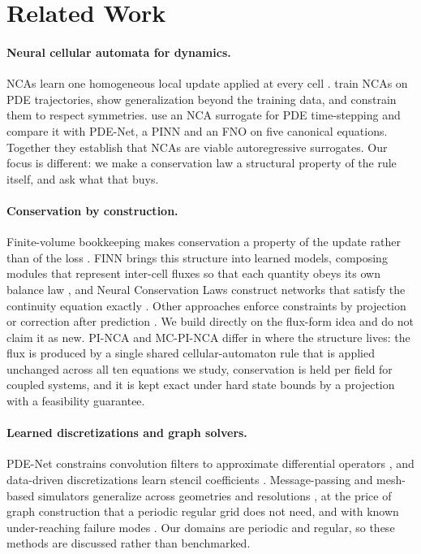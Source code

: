 \documentclass{article}
\begin{document}
\section{Related Work}
\label{sec:related}
\paragraph{Neural cellular automata for dynamics.}
NCAs learn one homogeneous local update applied at every cell
\citep{mordvintsev2020growing}. \citet{richardson2024patterns} train NCAs on PDE
trajectories, show generalization beyond the training data, and constrain them to respect
symmetries. \citet{saha2026timestepping} use an NCA surrogate for PDE time-stepping and
compare it with PDE-Net, a PINN and an FNO on five canonical equations. Together they
establish that NCAs are viable autoregressive surrogates. Our focus is different: we make
a conservation law a structural property of the rule itself, and ask what that buys.

\paragraph{Conservation by construction.}
Finite-volume bookkeeping makes conservation a property of the update rather than of the
loss \citep{leveque2002finite}. FINN brings this structure into learned models, composing
modules that represent inter-cell fluxes so that each quantity obeys its own balance law
\citep{praditia2021finn,karlbauer2022composing}, and Neural Conservation Laws construct
networks that satisfy the continuity equation exactly \citep{richterpowell2022conservation}.
Other approaches enforce constraints by projection or correction after prediction
\citep{hansen2023probconserv,liu2024clawno}. We build directly on the flux-form idea and
do not claim it as new. PI-NCA and MC-PI-NCA differ in where the structure lives: the flux
is produced by a single shared cellular-automaton rule that is applied unchanged across
all ten equations we study, conservation is held per field for coupled systems, and it is
kept exact under hard state bounds by a projection with a feasibility guarantee.

\paragraph{Learned discretizations and graph solvers.}
PDE-Net constrains convolution filters to approximate differential operators
\citep{long2018pdenet}, and data-driven discretizations learn stencil coefficients
\citep{barsinai2019discretizations}. Message-passing and mesh-based simulators generalize
across geometries and resolutions \citep{brandstetter2022message,pfaff2021mesh,%
sanchez2020simulation}, at the price of graph construction that a periodic regular grid
does not need, and with known under-reaching failure modes
\citep{tesan2025underreaching}. Our domains are periodic and regular, so these methods are
discussed rather than benchmarked.
\end{document}
